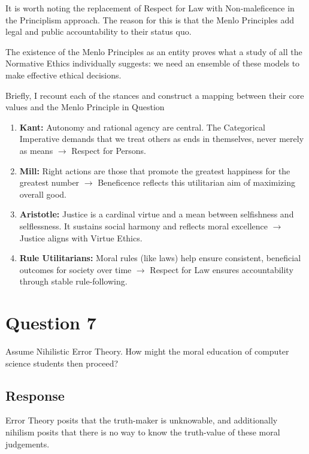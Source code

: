 \documentclass{scrartcl}
\begin{document}
It is worth noting the replacement of Respect for Law with Non-maleficence in the Principlism approach. The reason for this is that the Menlo Principles add legal and public accountability to their status quo.

The existence of the Menlo Principles as an entity proves what a study of all the Normative Ethics individually suggests: we need an ensemble of these models to make effective ethical decisions.

Briefly, I recount each of the stances and construct a mapping between their core values and the Menlo Principle in Question

\begin{enumerate}
    \item \textbf{Kant:} Autonomy and rational agency are central. The Categorical Imperative demands that we treat others as ends in themselves, never merely as means \(\rightarrow\) Respect for Persons.

    \item \textbf{Mill:} Right actions are those that promote the greatest happiness for the greatest number \(\rightarrow\) Beneficence reflects this utilitarian aim of maximizing overall good.

    \item \textbf{Aristotle:} Justice is a cardinal virtue and a mean between selfishness and selflessness. It sustains social harmony and reflects moral excellence \(\rightarrow\) Justice aligns with Virtue Ethics.

    \item \textbf{Rule Utilitarians:} Moral rules (like laws) help ensure consistent, beneficial outcomes for society over time \(\rightarrow\) Respect for Law ensures accountability through stable rule-following.
\end{enumerate}

\newpage
\section{Question 7}
\begin{tcolorbox}[colback=white,colframe=purple, sharp corners]
    Assume Nihilistic Error Theory. How might the moral education of computer science students then proceed?
\end{tcolorbox}

\subsection{Response}
Error Theory posits that the truth-maker is unknowable, and additionally nihilism posits that there is no way to know the truth-value of these moral judgements.
\end{document}
